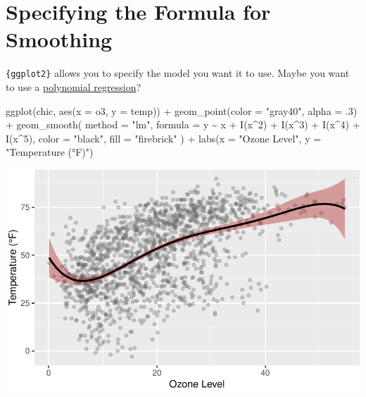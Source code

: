 \documentclass[
  letterpaper,
  DIV=11,
  numbers=noendperiod]{scrreprt}
\newenvironment{Shaded}{\begin{snugshade}}{\end{snugshade}}
\newcommand{\AttributeTok}[1]{\textcolor[rgb]{0.40,0.45,0.13}{#1}}
\newcommand{\DecValTok}[1]{\textcolor[rgb]{0.68,0.00,0.00}{#1}}
\newcommand{\FunctionTok}[1]{\textcolor[rgb]{0.28,0.35,0.67}{#1}}
\newcommand{\NormalTok}[1]{\textcolor[rgb]{0.00,0.23,0.31}{#1}}
\newcommand{\SpecialCharTok}[1]{\textcolor[rgb]{0.37,0.37,0.37}{#1}}
\newcommand{\StringTok}[1]{\textcolor[rgb]{0.13,0.47,0.30}{#1}}
\begin{document}
\section{Specifying the Formula for
Smoothing}\label{specifying-the-formula-for-smoothing}

\texttt{\{ggplot2\}} allows you to specify the model you want it to use.
Maybe you want to use a
\href{https://en.wikipedia.org/wiki/Polynomial_regression}{polynomial
regression}?

\begin{Shaded}
\begin{Highlighting}[]
\FunctionTok{ggplot}\NormalTok{(chic, }\FunctionTok{aes}\NormalTok{(}\AttributeTok{x =}\NormalTok{ o3, }\AttributeTok{y =}\NormalTok{ temp)) }\SpecialCharTok{+}
  \FunctionTok{geom\_point}\NormalTok{(}\AttributeTok{color =} \StringTok{"gray40"}\NormalTok{, }\AttributeTok{alpha =}\NormalTok{ .}\DecValTok{3}\NormalTok{) }\SpecialCharTok{+}
  \FunctionTok{geom\_smooth}\NormalTok{(}
    \AttributeTok{method =} \StringTok{"lm"}\NormalTok{,}
    \AttributeTok{formula =}\NormalTok{ y }\SpecialCharTok{\textasciitilde{}}\NormalTok{ x }\SpecialCharTok{+} \FunctionTok{I}\NormalTok{(x}\SpecialCharTok{\^{}}\DecValTok{2}\NormalTok{) }\SpecialCharTok{+} \FunctionTok{I}\NormalTok{(x}\SpecialCharTok{\^{}}\DecValTok{3}\NormalTok{) }\SpecialCharTok{+} \FunctionTok{I}\NormalTok{(x}\SpecialCharTok{\^{}}\DecValTok{4}\NormalTok{) }\SpecialCharTok{+} \FunctionTok{I}\NormalTok{(x}\SpecialCharTok{\^{}}\DecValTok{5}\NormalTok{),}
    \AttributeTok{color =} \StringTok{"black"}\NormalTok{,}
    \AttributeTok{fill =} \StringTok{"firebrick"}
\NormalTok{  ) }\SpecialCharTok{+}
  \FunctionTok{labs}\NormalTok{(}\AttributeTok{x =} \StringTok{"Ozone Level"}\NormalTok{, }\AttributeTok{y =} \StringTok{"Temperature (°F)"}\NormalTok{)}
\end{Highlighting}
\end{Shaded}

\includegraphics{ch17_files/figure-pdf/GAM-spec1-1.pdf}
\end{document}
